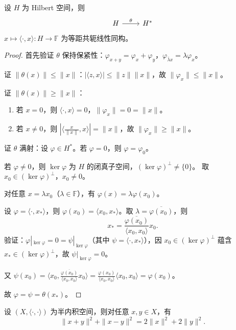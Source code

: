 \documentclass[lang=cn,a4paper,newtx,section]{elegantbook}
\begin{document}
\begin{theorem}\label{thm:riesz-representation-hilbert}
  设 $H$ 为 Hilbert 空间，则
  \[
    \begin{tikzcd}
      H \arrow[r,"\theta"] & H^*
    \end{tikzcd}
  \]
  $x\mapsto\langle\cdot,x\rangle:H\to\mathbb{F}$ 为等距共轭线性同构。
\end{theorem}

\begin{proof}
  首先验证 $\theta$ 保持保紧性：$\varphi_{x+y}=\varphi_x+\varphi_y$，$\varphi_{\bar{\lambda}x}=\lambda\varphi_x$。

  证 $\|\theta(x)\|\le\|x\|$：$|\langle z,x\rangle|\le\|z\|\|x\|$，故 $\|\varphi_x\|\le\|x\|$。

  证 $\|\theta(x)\|\ge\|x\|$：
  \begin{enumerate}
    \item 若 $x=0$，则 $\langle\cdot,x\rangle=0$，$\|\varphi_x\|=0=\|x\|$。
    \item 若 $x\ne 0$，则 $|\langle\frac{x}{\|x\|},x\rangle|=\|x\|$，故 $\|\varphi_x\|\ge\|x\|$。
  \end{enumerate}

  证 $\theta$ 满射：设 $\varphi\in H^*$。若 $\varphi=0$，则 $\varphi=\varphi_0$。

  若 $\varphi\ne 0$，则 $\ker\varphi$ 为 $H$ 的闭真子空间，$(\ker\varphi)^\perp\ne\{0\}$。
  取 $x_0\in(\ker\varphi)^\perp$，$x_0\ne 0$。

  对任意 $x=\lambda x_0$（$\lambda\in\mathbb{F}$），有 $\varphi(x)=\lambda\varphi(x_0)$。

  设 $\varphi=\langle\cdot,x_*\rangle$，则 $\varphi(x_0)=\langle x_0,x_*\rangle$。取 $\lambda=\overline{\varphi(x_0)}$，则
  \[
    x_*=\frac{\overline{\varphi(x_0)}}{\langle x_0,x_0\rangle}x_0.
  \]
  验证：$\varphi|_{\ker\varphi}=0=\psi|_{\ker\varphi}$（其中 $\psi=\langle\cdot,x_*\rangle$），因 $x_0\in(\ker\varphi)^\perp$ 蕴含 $x_*\in(\ker\varphi)^\perp$，故 $\psi|_{\ker\varphi}=0$。

  又 $\psi(x_0)=\langle x_0,\frac{\overline{\varphi(x_0)}}{\langle x_0,x_0\rangle}x_0\rangle=\frac{\varphi(x_0)}{\langle x_0,x_0\rangle}\langle x_0,x_0\rangle=\varphi(x_0)$。

  故 $\varphi=\psi=\theta(x_*)$。
\end{proof}

\begin{proposition}[平行四边形恒等式]\label{prop:parallelogram}
  设 $(X,\langle\cdot,\cdot\rangle)$ 为半内积空间，则对任意 $x,y\in X$，有
  \[
    \|x+y\|^2+\|x-y\|^2=2\|x\|^2+2\|y\|^2.
  \]
\end{proposition}
\end{document}
